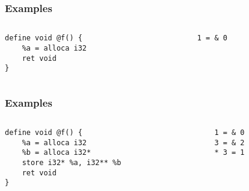 \documentclass{beamer}
\begin{document}
\begin{frame}[fragile]
\frametitle{Examples}

\begin{columns}

\begin{column}{0.5\textwidth}
\begin{lstlisting}
define void @f() {
    %a = alloca i32
    ret void
}
\end{lstlisting}
\end{column}

\begin{column}{0.5\textwidth}
\begin{lstlisting}
    1 = & 0
\end{lstlisting}

\end{column}

\end{columns}
\end{frame}

\begin{frame}[fragile]
\frametitle{Examples}

\begin{columns}

\begin{column}{0.5\textwidth}
\vspace{12pt}
\begin{lstlisting}
define void @f() {
    %a = alloca i32
    %b = alloca i32*
    store i32* %a, i32** %b
    ret void
}
\end{lstlisting}
\end{column}

\begin{column}{0.5\textwidth}
\begin{lstlisting}
    1 = & 0
    3 = & 2
    * 3 = 1
\end{lstlisting}

\end{column}

\end{columns}
\end{frame}
\end{document}
